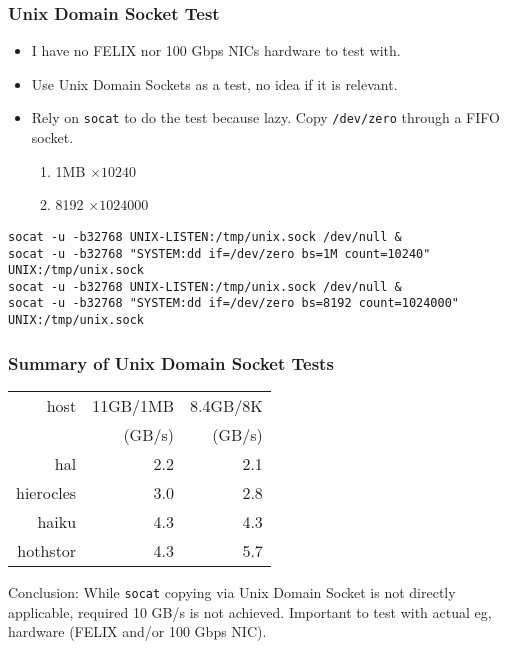 \documentclass{beamer}
\begin{document}
\begin{frame}[fragile]
  \frametitle{Unix Domain Socket Test}
  \begin{itemize}
  \item I have no FELIX nor 100 Gbps NICs hardware to test with.
  \item Use Unix Domain Sockets as a test, no idea if it is relevant.
  \item Rely on \texttt{socat} to do the test because lazy.  Copy \texttt{/dev/zero} through a FIFO socket.
    \begin{enumerate}
    \item 1MB $\times 10240$ 
    \item 8192 $\times 1024000$ 
    \end{enumerate}
  \end{itemize}
  
\tiny
\begin{verbatim}
socat -u -b32768 UNIX-LISTEN:/tmp/unix.sock /dev/null &
socat -u -b32768 "SYSTEM:dd if=/dev/zero bs=1M count=10240" UNIX:/tmp/unix.sock
socat -u -b32768 UNIX-LISTEN:/tmp/unix.sock /dev/null &
socat -u -b32768 "SYSTEM:dd if=/dev/zero bs=8192 count=1024000" UNIX:/tmp/unix.sock
\end{verbatim}
\end{frame}

\begin{frame}[fragile]
  \frametitle{Summary of Unix Domain Socket Tests}
  
  \begin{center}
    \begin{tabular}[h]{|r|r|r|}
      \hline
      host & 11GB/1MB & 8.4GB/8K \\
           & (GB/s) & (GB/s) \\
      \hline
      hal & 2.2 & 2.1 \\
      hierocles & 3.0 & 2.8 \\
      haiku & 4.3 & 4.3  \\
      hothstor & 4.3 & 5.7 \\
      \hline
    \end{tabular}
  \end{center}
  Conclusion: While \texttt{socat} copying via Unix Domain Socket is
  not directly applicable, required 10 GB/s is not achieved.
  Important to test with actual eg, hardware (FELIX and/or 100 Gbps NIC).
\end{frame}
\end{document}
